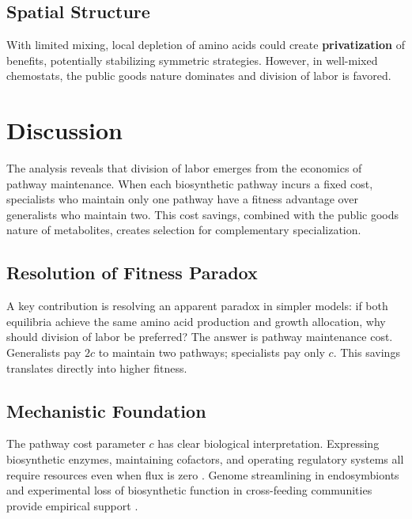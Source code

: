 \documentclass[11pt]{article}
\theoremstyle{definition}
\begin{document}
\subsection{Spatial Structure}

With limited mixing, local depletion of amino acids could create \textbf{privatization} of benefits, potentially stabilizing symmetric strategies. However, in well-mixed chemostats, the public goods nature dominates and division of labor is favored.

\section{Discussion}

The analysis reveals that division of labor emerges from the economics of pathway maintenance. When each biosynthetic pathway incurs a fixed cost, specialists who maintain only one pathway have a fitness advantage over generalists who maintain two. This cost savings, combined with the public goods nature of metabolites, creates selection for complementary specialization.

\subsection{Resolution of Fitness Paradox}

A key contribution is resolving an apparent paradox in simpler models: if both equilibria achieve the same amino acid production and growth allocation, why should division of labor be preferred? The answer is pathway maintenance cost. Generalists pay $2c$ to maintain two pathways; specialists pay only $c$. This savings translates directly into higher fitness.

\subsection{Mechanistic Foundation}

The pathway cost parameter $c$ has clear biological interpretation. Expressing biosynthetic enzymes, maintaining cofactors, and operating regulatory systems all require resources even when flux is zero \citep{lynch2015evolutionary}. Genome streamlining in endosymbionts and experimental loss of biosynthetic function in cross-feeding communities provide empirical support \citep{moran2007genomic, harcombe2018evolution}.
\end{document}
